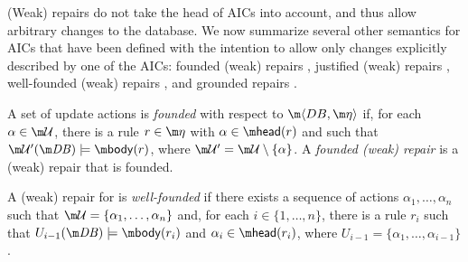 (Weak) repairs do not take the head of AICs into account, and thus allow arbitrary changes to the database. We now summarize several other semantics for AICs that have been defined with the intention to allow only changes explicitly described by one of the AICs: founded (weak) repairs \cite{iclp/CaropreseGSZ06}, justified (weak) repairs \cite{tplp/CaropreseT11}, well-founded (weak) repairs \cite{tase/Cruz-FilipeEGN13}, and grounded repairs \cite{iclp/Cruz-Filipe16}.

%  


\begin{definition}
 A set of update actions \UU is \emph{founded} with respect to $\fulldb$ if, for each $\alpha \in \UU$, there is a rule  $r\in \aics$ with $\alpha\in\head(r)$ and such that $\UU'(\db)\models \body(r)$, where $\UU'=\UU\setminus\{\alpha\}$. A \emph{founded (weak) repair} is a (weak) repair that is founded.
\end{definition}

\begin{definition}
 A (weak) repair \UU for \fulldb is \emph{well-founded} if there exists a sequence of actions $\alpha_1,\dots,\alpha_n$ such that $\UU=\{\alpha_1,\dots,\alpha_n\}$ and, for each $i\in\{1,\dots,n\}$, there is a rule $r_i$ such that $U_{i-1}(\db) \models \body (r_i)$ and $\alpha_i \in \head(r_i)$, where $U_{i-1} = \{\alpha_1,\dots,\alpha_{i-1}\}$.
\end{definition}

